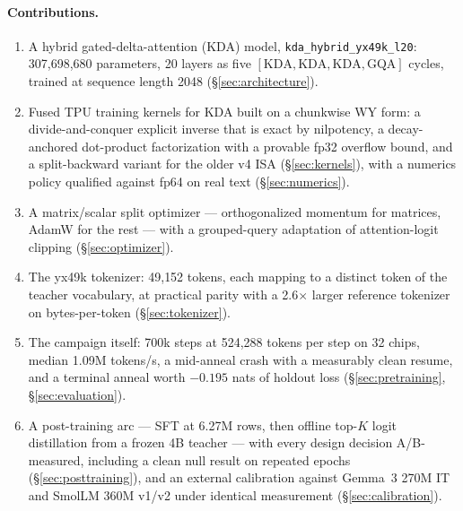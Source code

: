 \paragraph{Contributions.}
\begin{enumerate}
  \item A hybrid gated-delta-attention (KDA) model,
  \texttt{kda\_hybrid\_yx49k\_l20}: 307{,}698{,}680 parameters, 20 layers
  as five \([\mathrm{KDA},\mathrm{KDA},\mathrm{KDA},\mathrm{GQA}]\)
  cycles, trained at sequence length 2048 (\S\ref{sec:architecture}).
  \item Fused TPU training kernels for KDA built on a chunkwise WY form:
  a divide-and-conquer explicit inverse that is exact by nilpotency, a
  decay-anchored dot-product factorization with a provable fp32 overflow
  bound, and a split-backward variant for the older v4 ISA
  (\S\ref{sec:kernels}), with a numerics policy qualified against fp64 on
  real text (\S\ref{sec:numerics}).
  \item A matrix/scalar split optimizer --- orthogonalized momentum for
  matrices, AdamW for the rest --- with a grouped-query adaptation of
  attention-logit clipping (\S\ref{sec:optimizer}).
  \item The yx49k tokenizer: 49{,}152 tokens, each mapping to a distinct
  token of the teacher vocabulary, at practical parity with a
  2.6$\times$ larger reference tokenizer on bytes-per-token
  (\S\ref{sec:tokenizer}).
  \item The campaign itself: 700k steps at 524{,}288 tokens per step on
  32 chips, median 1.09M tokens/s, a mid-anneal crash with a
  measurably clean resume, and a terminal anneal worth $-0.195$ nats of
  holdout loss (\S\ref{sec:pretraining}, \S\ref{sec:evaluation}).
  \item A post-training arc --- SFT at 6.27M rows, then offline top-$K$
  logit distillation from a frozen 4B teacher --- with every design
  decision A/B-measured, including a clean null result on repeated
  epochs (\S\ref{sec:posttraining}), and an external calibration against
  Gemma~3 270M IT and SmolLM 360M v1/v2 under identical measurement
  (\S\ref{sec:calibration}).
\end{enumerate}

